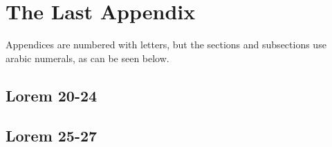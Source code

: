 \chapter{The Last Appendix}
\label{app:n}
Appendices are numbered with letters, but the sections and subsections use
arabic numerals, as can be seen below.

\section{Lorem 20-24}

\section{Lorem 25-27}
